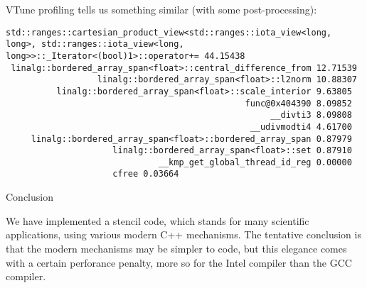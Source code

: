 \begin{comment}
  This makes send if we consider our `diy' implementation:
  \cxxverbatimsnippet{d2ddiyiter}
  Unfortunately it's not the plus-plus operator but the plus-and-is,
  which is the bottlenect.
  For the former we can come up with trickery to lose the divisions:
  \cxxverbatimsnippet{d2ddiziter}
  for the latter that's much harder.
  (Note that the tricked code has no conditionals that could give branch mispredictions!)

  Unfortunately, \indexterm{perf} does not help us much here:
  \begin{lstlisting}[language=verbatim]
    35.25%  [.] linalg::bordered_array_diy2e<float>::l2norm
    31.39%  [.] linalg::bordered_array_diy2e<float>::central_difference_from
    30.46%  [.] linalg::bordered_array_diy2e<float>::scale_interior
    2.29%  [.] linalg::bordered_array_diy2e<float>::set
  \end{lstlisting}
  We get no timings for the embedded iterator.
  Note the counterintuitive result that the norm computation takes more time than the
  central difference,
  despite the latter having more operations
  and more complicated memory access.
\end{comment}

VTune profiling tells us something similar
(with some post-processing):
\begin{lstlisting}[language=verbatim]
std::ranges::cartesian_product_view<std::ranges::iota_view<long, long>, std::ranges::iota_view<long, long>>::_Iterator<(bool)1>::operator+= 44.15438
 linalg::bordered_array_span<float>::central_difference_from 12.71539
                  linalg::bordered_array_span<float>::l2norm 10.88307
          linalg::bordered_array_span<float>::scale_interior 9.63805
                                               func@0x404390 8.09852
                                                    __divti3 8.09808
                                                __udivmodti4 4.61700
     linalg::bordered_array_span<float>::bordered_array_span 0.87979
                     linalg::bordered_array_span<float>::set 0.87910
                              __kmp_get_global_thread_id_reg 0.00000
                     cfree 0.03664
\end{lstlisting}

 {Conclusion}

We have implemented a stencil code, which stands for many scientific applications,
using various modern C++ mechanisms.
The tentative conclusion is that the modern mechanisms may be simpler to code,
but this elegance comes with a certain perforance penalty,
more so for the Intel compiler than the GCC compiler.

